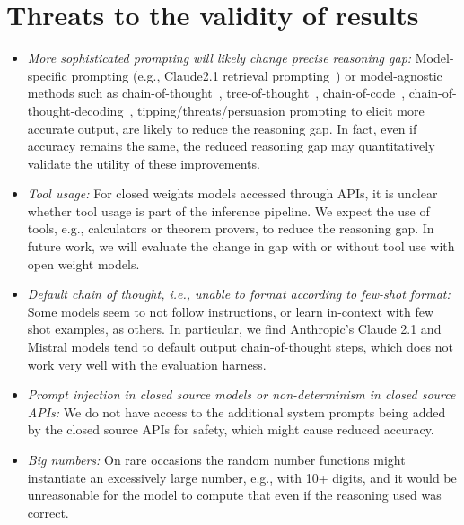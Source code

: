 \documentclass[11pt,a4paper]{article}
\begin{document}
\section{Threats to the validity of results}
\begin{itemize}
  \item {\em More sophisticated prompting will likely change precise reasoning
    gap:} Model-specific prompting (e.g., Claude2.1 retrieval
    prompting~\cite{claude-retrieval-prompting}) or model-agnostic methods such
    as chain-of-thought~\cite{chain-of-thought},
    tree-of-thought~\cite{tree-of-thought}, chain-of-code~\cite{chain-of-code},
    chain-of-thought-decoding~\cite{cot-decoding},
    tipping/threats/persuasion prompting to elicit more accurate output, are
    likely to reduce the reasoning gap. In fact, even if accuracy remains the
    same, the reduced reasoning gap may quantitatively validate the utility of
    these improvements.

  \item {\em Tool usage:} For closed weights models accessed through APIs, it is
    unclear whether tool usage is part of the inference pipeline. We expect the
    use of tools, e.g., calculators or theorem provers, to reduce the reasoning
    gap. In future work, we will evaluate the change in gap with or without
    tool use with open weight models.

  \item {\em Default chain of thought, i.e., unable to format according to
    few-shot format:} Some models seem to not follow instructions, or learn in-context
    with few shot examples, as others. In particular, we find Anthropic's Claude 2.1 and
    Mistral models tend to default output chain-of-thought steps, which does not
    work very well with the evaluation harness.

  \item {\em Prompt injection in closed source models or non-determinism in
    closed source APIs:} We do not have access to the additional system prompts being
    added by the closed source APIs for safety, which might cause reduced accuracy.

  \item {\em Big numbers:} On rare occasions the random number functions might
    instantiate an excessively large number, e.g., with 10+ digits, and it would be unreasonable for the model
    to compute that even if the reasoning used was correct.


\end{itemize}
\end{document}
